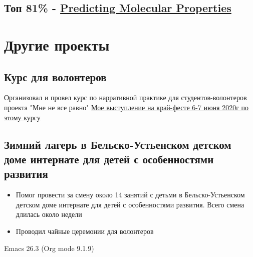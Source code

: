 \documentclass[11pt]{article}
\begin{document}
\subsection{Топ 81\% - \href{https://www.kaggle.com/c/champs-scalar-coupling}{Predicting Molecular Properties}}
\label{sec:org7126578}
\section{Другие проекты}
\label{sec:orgf0c4a6e}
\subsection{Курс для волонтеров}
\label{sec:org3d713ae}
Организовал и провел курс по нарративной практике для студентов-волонтеров проекта "Мне не все равно"
\href{https://www.youtube.com/watch?v=EDkDUp0PgPE\&list=PL7GczH8KmOkD5QFvkeFVhJj6aGqpHkmeL\&index=12\&t=0s}{Мое выступление на край-фесте 6-7 июня 2020г по этому курсу}
\subsection{Зимний лагерь в Бельско-Устьенском детском доме интернате для детей с особенностями развития}
\label{sec:orgb99c82d}
\begin{itemize}
\item Помог провести за смену около 14 занятий с детьми в Бельско-Устьенском детском доме интернате для детей с особенностями развития. Всего смена длилась около недели
\item Проводил чайные церемонии для волонтеров
\end{itemize}
Emacs 26.3 (Org mode 9.1.9)
\end{document}
